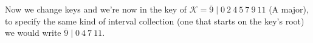 \documentclass[preview]{standalone}
\begin{document}
\begin{center}
Now we change keys and we're now in the key of $ \mathcal{K} =  \overline{9} \mid 0 \ 2 \ 4 \ 5 \ 7 \ 9 \ 11$ (A major), to specify the same kind of interval collection (one that starts on the key's root) we would write $ \overline{9} \mid 0 \ 4 \ 7 \ 11$.
\end{center}
\end{document}
